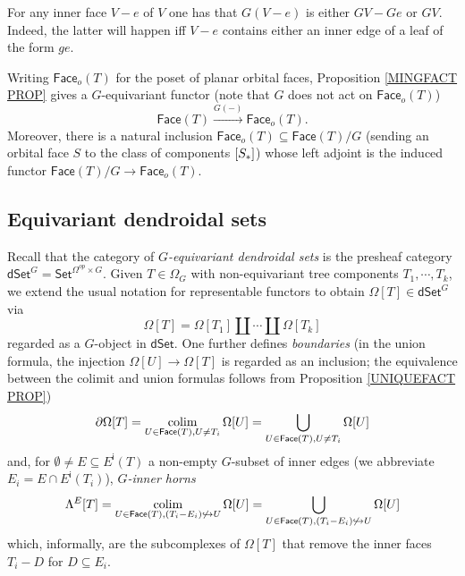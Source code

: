 \documentclass[a4paper,10pt,draft]{article}%
\begin{document}
\begin{remark}\label{GINNER REM}
	For any inner face $V-e$ of $V$ one has 
	that $G(V-e)$ is either $GV - Ge$ or $GV$.
	Indeed, the latter will happen iff $V-e$ contains either an inner edge of a leaf of the form $ge$.
\end{remark}


\begin{remark}
	Writing $\mathsf{Face}_o(T)$ for the poset of planar orbital faces, Proposition \ref{MINGFACT PROP} gives a $G$-equivariant functor (note that $G$ does not act on $\mathsf{Face}_o(T)$)
\[
	\mathsf{Face}(T) \xrightarrow{G(-)} \mathsf{Face}_o(T).
\]
Moreover, there is a natural inclusion
$\mathsf{Face}_o(T) \subseteq \mathsf{Face}(T)/G$ (sending an orbital face $S$ to the class of components $[S_{\**}]$)
whose left adjoint is the induced functor 
$\mathsf{Face}(T)/G \to \mathsf{Face}_o(T)$.
\end{remark}


\subsection{Equivariant dendroidal sets}


Recall \cite[\S 5.4]{Per17} that the category of 
\textit{$G$-equivariant dendroidal sets}
is the presheaf category 
$\mathsf{dSet}^G = \mathsf{Set}^{\Omega^{op} \times G}$.
Given $T \in \Omega_G$ with non-equivariant tree components $T_1,\cdots,T_k$,
we extend the usual notation for representable functors 
to obtain $\Omega[T] \in \mathsf{dSet}^G$ via
\[
	\Omega[T] = \Omega[T_1] \amalg \cdots \amalg \Omega[T_k]
\]
regarded as a $G$-object in $\mathsf{dSet}$.
One further defines \textit{boundaries} (in the union formula, 
the injection $\Omega[U] \to \Omega[T]$ is regarded as 
an inclusion; the equivalence between the colimit and union formulas follows from Proposition \ref{UNIQUEFACT PROP})
\[
	\partial \Omega[T] = 
	\mathop{\operatorname{colim}}_{U \in \mathsf{Face}(T),U \neq T_i}
	\Omega[U] =
	\bigcup_{U \in \mathsf{Face}(T),U \neq T_i}
	\Omega[U]
\]
and, for $\emptyset \neq E \subseteq E^{\mathsf{i}}(T)$ a
non-empty $G$-subset of inner edges 
(we abbreviate $E_i = E \cap E^{\mathsf{i}}(T_i)$), \textit{$G$-inner horns}
\[
	\Lambda^{E}[T] = 
	\mathop{\operatorname{colim}}_{U \in 
	\mathsf{Face}(T),
	(T_i - E_i) \not \hookrightarrow U}
	\Omega[U] =
	\bigcup_{U \in 
	\mathsf{Face}(T),
	(T_i - E_i) \not \hookrightarrow U}
	\Omega[U]
\]
which, informally, are the subcomplexes of $\Omega[T]$ that remove the inner faces $T_i-D$ for $D \subseteq E_i$.
\end{document}

